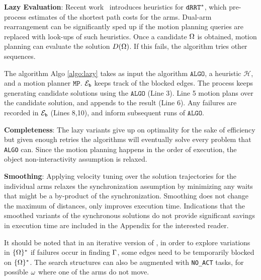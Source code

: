 
\noindent\textbf{Lazy Evaluation}: Recent work~\cite{shome2017improving} introduces heuristics for $ {\tt dRRT^*} $, which pre-process estimates of the shortest path costs for the arms. Dual-arm rearrangement can be significantly sped up if the motion planning queries are replaced with look-ups of such heuristics. Once a candidate $ {{\Omega}} $ is obtained, motion planning can evaluate the solution $ {D}({{\Omega}}) $. If this fails, the algorithm tries other sequences. 


The algorithm Algo \ref{algo:lazy} takes as input the algorithm $ \mathtt{ALGO} $, a heuristic $ \mathcal{H} $, and a motion planner $ \mathtt{MP} $. $ \mathcal{E}_{\mathtt{b}}$ keeps track of the blocked edges. The process keeps generating candidate solutions using the $ \mathtt{ALGO} $ (Line 3). Line 5 motion plans over the candidate solution, and appends to the result (Line 6). Any failures are recorded in  $ \mathcal{E}_{\mathtt{b}}$ (Lines 8,10), and inform subsequent runs of $ \mathtt{ALGO} $.


\noindent\textbf{Completeness}: 
The lazy variants give up on optimality for the sake of efficiency but given enough retries the algorithms will eventually solve every problem that {\tt ALGO} can. Since the motion planning happens in the order of execution, the object non-interactivity assumption is relaxed.

\noindent\textbf{Smoothing}: 
Applying velocity tuning over the solution trajectories for the individual arms relaxes the synchronization assumption
by minimizing any waits that might be a by-product of the synchronization. 
Smoothing does not change the maximum of distances, only improves execution time. Indications that the smoothed variants of the synchronous solutions do not provide significant savings in execution time are included in the Appendix \cite{Shome2018WAFR} for the interested reader.

It should be noted that in an iterative version of \algo, in order to explore variations in $ \{{{\Omega}}\}^* $ if failures occur in finding ${\Gamma}$, some edges need to be temporarily blocked on $ \{{{\Omega}}\}^* $. The search structures can also be augmented with {\tt NO\_ACT} tasks, for possible ${\omega}$ where one of the arms do not move. 

